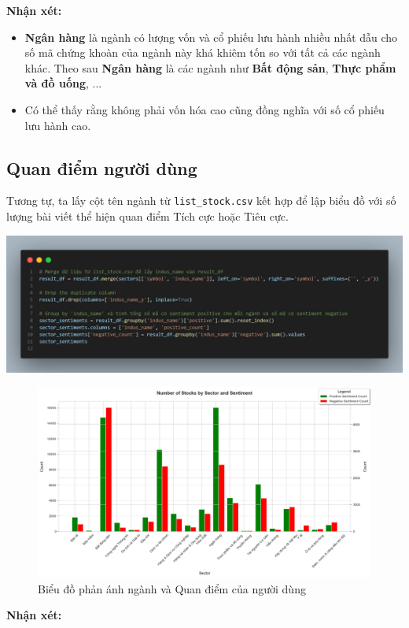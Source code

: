 \textbf{Nhận xét:}
\begin{itemize}
    \item \textbf{Ngân hàng} là ngành có lượng vốn và cổ phiếu lưu hành nhiều nhất dẫu cho số mã chứng khoàn của ngành này khá khiêm tốn so với tất cả các ngành khác. Theo sau \textbf{Ngân hàng} là các ngành như \textbf{Bất động sản}, \textbf{Thực phẩm và đồ uống}, ...
    \item Có thể thấy rằng không phải vốn hóa cao cũng đồng nghĩa với số cổ phiếu lưu hành cao.
\end{itemize}

\newpage
\subsection{Quan điểm người dùng}
Tương tự, ta lấy cột tên ngành từ \texttt{list\_stock.csv} kết hợp để lập biểu đồ với số lượng bài viết thể hiện quan điểm Tích cực hoặc Tiêu cực.

\begin{center} 
\includegraphics[width=1\linewidth]{images/code-2.2-sentiments.png}
\end{center}

\begin{figure}[H]
    \centering
    \includegraphics[width=1\linewidth]{images/plot-2.18-column_chart.png}
    \caption{Biểu đồ phản ánh ngành và Quan điểm của người dùng}
    \label{fig:3.3}
\end{figure}
\textbf{Nhận xét:}

